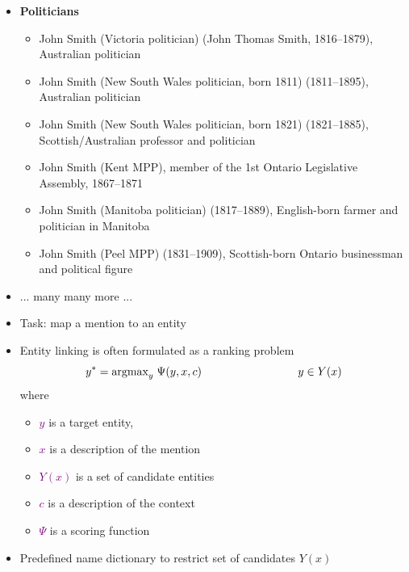 \documentclass[landscape]{jhuslides3C}
\newcommand{\maths}[1]{\textcolor{purple}{#1}}
\begin{document}
{\begin{itemize}
\begin{itemize}
\end{itemize}
\item {\bf Politicians}
\begin{itemize}
\item John Smith (Victoria politician) (John Thomas Smith, 1816--1879), Australian politician
\item John Smith (New South Wales politician, born 1811) (1811--1895), Australian politician
\item John Smith (New South Wales politician, born 1821) (1821--1885), Scottish/Australian professor and politician
\item John Smith (Kent MPP), member of the 1st Ontario Legislative Assembly, 1867--1871
\item John Smith (Manitoba politician) (1817--1889), English-born farmer and politician in Manitoba
\item John Smith (Peel MPP) (1831--1909), Scottish-born Ontario businessman and political figure
\end{itemize}
\item ... many many more ...
\end{itemize}
}
\vfill


\vfill
\begin{itemize}
\item Task: map a mention to an entity
\item Entity linking is often formulated as a ranking problem
\maths{\begin{equation*}
y^* = \text{argmax}_y \; \Psi(y, x, c) \hspace{3cm} y \in Y(x)\vspace{-5mm}
\end{equation*}}
where 
\begin{itemize}
\item \maths{$y$} is a target entity,
\item \maths{$x$} is a description of the mention
\item \maths{$Y(x)$} is a set of candidate entities
\item \maths{$c$} is a description of the context
\item \maths{$\Psi$} is a scoring function
\end{itemize}
\item Predefined name dictionary to restrict set of candidates $Y(x)$
\end{itemize}
\vfill
\end{document}
